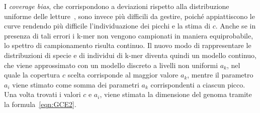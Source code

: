 \documentclass[crop=false, class=book]{standalone}
\begin{document}
	I \textit{coverage bias}, che corrispondono a deviazioni rispetto alla distribuzione uniforme delle letture~\cite{ross2013characterizing}, sono invece più difficili da gestire, poiché appiattiscono le curve rendendo più difficile l'individuazione dei picchi e la stima di $c$. Anche se in presenza di tali errori i k-mer non vengono campionati in maniera equiprobabile, lo spettro di campionamento risulta continuo. Il nuovo modo di rappresentare le distribuzioni di specie e di individui di k-mer diventa quindi un modello continuo, che viene approssimato con un modello discreto a livelli non uniformi $a_k$, nel quale la copertura $c$ scelta corrisponde al maggior valore $a_k$, mentre il parametro $a_i$ viene stimato come somma dei parametri $a_k$ corrispondenti a ciascun picco. Una volta trovati i valori $c$ e $a_i$, viene stimata la dimensione del genoma tramite la formula~\vref{eqn:GCE2}. 
	
	
\end{document}
